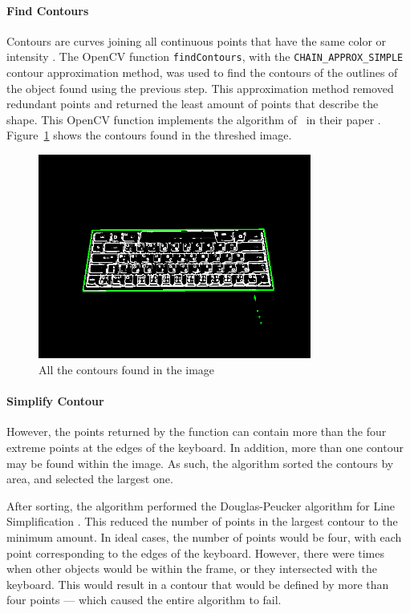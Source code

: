 \documentclass{report}
\begin{document}
\paragraph{Find Contours}
\label{section:metho-algo-key-contours}
Contours are curves joining all continuous points that have the same color or
intensity \parencite{opencv-contours}. The OpenCV function
\texttt{findContours}, with the \texttt{CHAIN\_APPROX\_SIMPLE} contour
approximation method, was used to find the contours of the outlines of the
object found using the previous step. This approximation method removed
redundant points and returned the least amount of points that describe the
shape. This OpenCV function implements the algorithm of~\cite{contours} in their
paper . Figure~\ref{fig:metho-algo-contours} shows the contours
found in the threshed image.

\begin{figure}[H]
	\centering
	\includegraphics[width=0.8\textwidth]{find-contours.png}
	\caption{All the contours found in the image}
	\label{fig:metho-algo-contours}
	\centering
\end{figure}

\paragraph{Simplify Contour}
However, the points returned by the function can contain more than the four
extreme points at the edges of the keyboard. In addition, more than one contour
may be found within the image. As such, the algorithm sorted the contours by
area, and selected the largest one.

After sorting, the algorithm performed the Douglas-Peucker algorithm for Line
Simplification \parencite{douglas-peucker}. This reduced the number of points in
the largest contour to the minimum amount. In ideal cases, the number of points
would be four, with each point corresponding to the edges of the keyboard.
However, there were times when other objects would be within the frame, or they
intersected with the keyboard. This would result in a contour that would be
defined by more than four points --- which caused the entire algorithm to fail.
\end{document}

